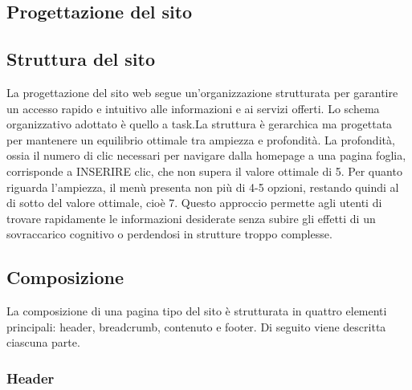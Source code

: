 \documentclass[a4paper, 12pt]{article}
\begin{document}
\begin{justify}
\section{Progettazione del sito}

\subsection{Struttura del sito}

La progettazione del sito web segue un'organizzazione strutturata per garantire un accesso rapido e intuitivo alle informazioni e ai servizi offerti. Lo schema organizzativo adottato è quello a task.La struttura è gerarchica ma progettata per mantenere un equilibrio ottimale tra ampiezza e profondità. La profondità, ossia il numero di clic necessari per navigare dalla homepage a una pagina foglia, corrisponde a INSERIRE clic, che non supera il valore ottimale di 5. Per quanto riguarda l'ampiezza, il menù presenta non più di 4-5 opzioni, restando quindi al di sotto del valore ottimale, cioè 7. Questo approccio permette agli utenti di trovare rapidamente le informazioni desiderate senza subire gli effetti di un sovraccarico cognitivo o perdendosi in strutture troppo complesse.

\subsection{Composizione}

La composizione di una pagina tipo del sito è strutturata in quattro elementi principali: header, breadcrumb, contenuto e footer. Di seguito viene descritta ciascuna parte.

\subsubsection{Header}


\end{justify}
\end{document}

